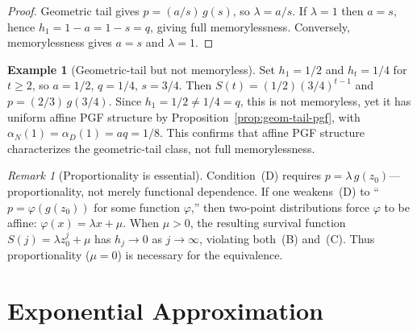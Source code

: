 \documentclass[11pt]{article}
\theoremstyle{plain}
\theoremstyle{definition}
\newtheorem{example}[theorem]{Example}
\theoremstyle{remark}
\newtheorem{remark}[theorem]{Remark}
\begin{document}
\begin{proof}
Geometric tail gives $p = (a/s)\,g(s)$, so $\lambda = a/s$.  If $\lambda = 1$ then $a = s$, hence $h_1 = 1-a = 1-s = q$, giving full memorylessness.  Conversely, memorylessness gives $a = s$ and $\lambda = 1$.
\end{proof}

\begin{example}[Geometric-tail but not memoryless]\label{ex:geom-tail}
Set $h_1 = 1/2$ and $h_t = 1/4$ for $t \geq 2$, so $a = 1/2$, $q = 1/4$, $s = 3/4$.  Then $S(t) = (1/2)(3/4)^{t-1}$ and $p = (2/3)\,g(3/4)$.  Since $h_1 = 1/2 \neq 1/4 = q$, this is not memoryless, yet it has uniform affine PGF structure by Proposition~\ref{prop:geom-tail-pgf}, with $\alpha_N(1) = \alpha_D(1) = aq = 1/8$.  This confirms that affine PGF structure characterizes the geometric-tail class, not full memorylessness.
\end{example}

\begin{remark}[Proportionality is essential]\label{rem:proportionality}
Condition~(D) requires $p = \lambda\,g(z_0)$---proportionality, not merely functional dependence.  If one weakens~(D) to ``$p = \varphi(g(z_0))$ for some function $\varphi$,'' then two-point distributions force $\varphi$ to be affine: $\varphi(x) = \lambda x + \mu$.  When $\mu > 0$, the resulting survival function $S(j) = \lambda z_0^j + \mu$ has $h_j \to 0$ as $j \to \infty$, violating both~(B) and~(C).  Thus proportionality ($\mu = 0$) is necessary for the equivalence.
\end{remark}






\section{Exponential Approximation}\label{sec:exp-approx}
\end{document}
